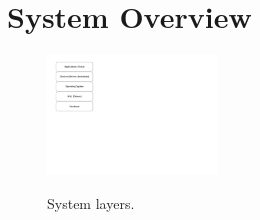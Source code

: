 %
%
%
%
%

%
%
%
%
%
%

\chapter{System Overview} \label{ch:system-overview}

\begin{figure}[!ht]
    \begin{center}
        \includegraphics[width=0.4\textwidth]{figures/system_layers.pdf}
        \label{fig:system-layers}
        \caption{System layers.}
    \end{center}
\end{figure}
